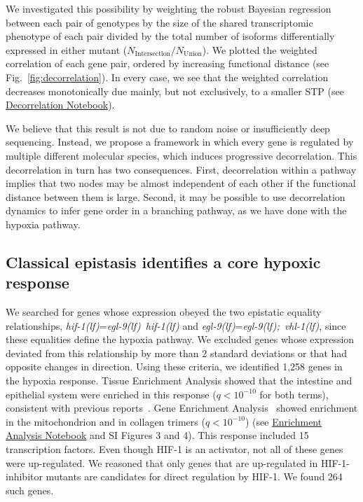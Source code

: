 \documentclass[9pt,twocolumn,twoside]{pnas-new}
\newcommand{\qval}[1]{$q<10^{-#1}$}
\newcommand{\gene}[1]{\mbox{\emph{#1}}}
\newcommand{\egl}{\gene{egl-9(lf)}}
\newcommand{\eglvhl}{\gene{egl-9(lf); vhl-1(lf)}}
\newcommand{\eglhif}{\gene{egl-9(lf) hif-1(lf)}}
\newcommand{\hif}{\gene{hif-1(lf)}}
\newcommand{\hifp}{HIF-1}
\newcommand{\hiftargets}{264}
\begin{document}
We investigated this possibility by weighting the robust Bayesian regression
between each pair of genotypes by the size of the shared transcriptomic
phenotype of each pair divided by the total number of isoforms differentially
expressed in either mutant ($N_\mathrm{Intersection}/N_{\mathrm{Union}}$). We
plotted the weighted correlation of each gene pair, ordered by increasing
functional distance (see Fig.~\ref{fig:decorrelation}). In every case, we see
that the weighted correlation decreases monotonically due mainly, but not
exclusively, to a smaller STP (see
\href{https://wormlabcaltech.github.io/mprsq/analysis_notebooks/10_decorrelation.html}
{Decorrelation Notebook}).

We believe that this result is not due to random noise or insufficiently deep
sequencing. Instead, we propose a framework in which every gene is regulated by
multiple different molecular species, which induces progressive decorrelation.
This decorrelation in turn has two consequences. First, decorrelation within a
pathway implies that two nodes may be almost independent of each other if the
functional distance between them is large. Second, it may be possible to use
decorrelation dynamics to infer gene order in a branching pathway, as we have
done with the hypoxia pathway.

\subsection{Classical epistasis identifies a core hypoxic response}
We searched for genes whose expression obeyed the two epistatic equality
relationships, \hif{}=\eglhif{} and \egl{}=\eglvhl{}, since these equalities
define the hypoxia pathway. We excluded genes whose expression deviated from
this relationship by more than 2 standard deviations or that had opposite
changes in direction. Using these criteria, we identified 1,258 genes in the
hypoxia response. Tissue Enrichment Analysis showed that the intestine and
epithelial system were enriched in this response (\qval{10} for both terms),
consistent with previous reports~\cite{Budde2010}. Gene Enrichment
Analysis~\cite{Angeles-Albores106369} showed enrichment in the mitochondrion and
in collagen trimers (\qval{10}) (see
\href{https://wormlabcaltech.github.io/mprsq/analysis_notebooks/3_ea_of_hypoxia_data.html}
{Enrichment Analysis Notebook} and SI Figures 3 and 4). This response included
15 transcription factors. Even though \hifp{} is
an activator, not all of these genes were up-regulated. We reasoned that only
genes that are up-regulated in \hifp{}-inhibitor mutants are candidates for
direct regulation by \hifp{}. We found \hiftargets{} such genes.
\end{document}
